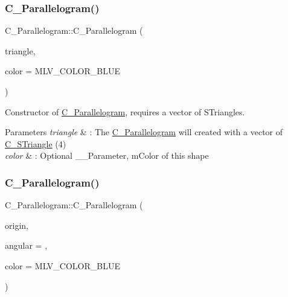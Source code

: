 \subsubsection{\texorpdfstring{C\+\_\+\+Parallelogram()}{C\_Parallelogram()}\hspace{0.1cm}{\footnotesize\ttfamily [5/6]}}
{\footnotesize\ttfamily C\+\_\+\+Parallelogram\+::\+C\+\_\+\+Parallelogram (\begin{DoxyParamCaption}\item[{const std\+::vector$<$ \hyperlink{classC__STriangle}{C\+\_\+\+S\+Triangle} $>$ \&}]{triangle,  }\item[{M\+L\+V\+\_\+\+Color}]{color = {\ttfamily MLV\+\_\+COLOR\+\_\+BLUE} }\end{DoxyParamCaption})\hspace{0.3cm}{\ttfamily [explicit]}}



Constructor of \hyperlink{classC__Parallelogram}{C\+\_\+\+Parallelogram}, requires a vector of S\+Triangles. 


\begin{DoxyParams}{Parameters}
{\em triangle} & \+: The \hyperlink{classC__Parallelogram}{C\+\_\+\+Parallelogram} will created with a vector of \hyperlink{classC__STriangle}{C\+\_\+\+S\+Triangle} (4) \\
\hline
{\em color} & \+: Optional \+\_\+\+\_\+\+Parameter, m\+Color of this shape \\
\hline
\end{DoxyParams}
\mbox{\label{classC__Parallelogram_abd470868efc5d3a002509a9e45e4ed63}} 
\subsubsection{\texorpdfstring{C\+\_\+\+Parallelogram()}{C\_Parallelogram()}\hspace{0.1cm}{\footnotesize\ttfamily [6/6]}}
{\footnotesize\ttfamily C\+\_\+\+Parallelogram\+::\+C\+\_\+\+Parallelogram (\begin{DoxyParamCaption}\item[{const \hyperlink{classT__Point}{T\+\_\+\+Point}$<$ double $>$ \&}]{origin,  }\item[{double}]{angular = {},  }\item[{M\+L\+V\+\_\+\+Color}]{color = {\ttfamily MLV\+\_\+COLOR\+\_\+BLUE} }\end{DoxyParamCaption})\hspace{0.3cm}{\ttfamily [explicit]}}



